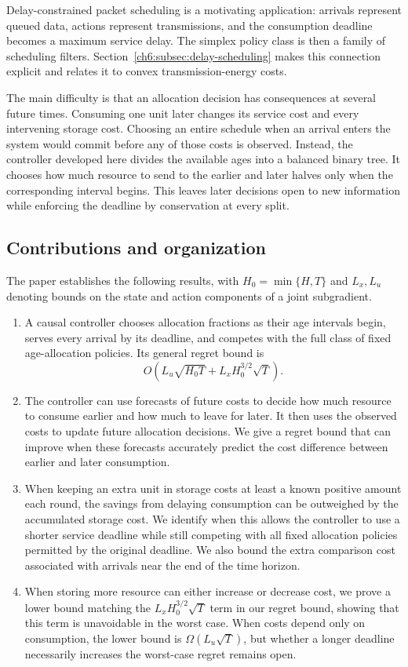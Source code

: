 \documentclass[11pt]{article}
\theoremstyle{plain}
\theoremstyle{remark}
\numberwithin{equation}{section}
\begin{document}
Delay-constrained packet scheduling is a motivating application:
arrivals represent queued data, actions represent transmissions, and the
consumption deadline becomes a maximum service delay. The simplex policy
class is then a family of scheduling filters. Section~\ref{ch6:subsec:delay-scheduling}
makes this connection explicit and relates it to convex transmission-energy
costs.

The main difficulty is that an allocation decision has consequences at
several future times. Consuming one unit later changes its service cost
and every intervening storage cost. Choosing an entire schedule when an
arrival enters the system would commit before any of those costs is
observed. Instead, the controller developed here divides the available ages
into a balanced binary tree. It chooses how much resource to send to the
earlier and later halves only when the corresponding interval begins.
This leaves later decisions open to new
information while enforcing the deadline by conservation at every split.

\subsection{Contributions and organization}

The paper establishes the following results, with
$H_0=\min\{H,T\}$ and $L_x,L_u$ denoting bounds on the state and action
components of a joint subgradient.
\begin{enumerate}[leftmargin=*]
\item A causal controller chooses allocation fractions as their age intervals
begin, serves every arrival by its deadline, and competes with the full class
of fixed age-allocation policies. Its general regret
bound is
\[
 O\!\left(L_u\sqrt{H_0T}+L_xH_0^{3/2}\sqrt T\right).
\]
\item The controller can use forecasts of future costs to decide how much
resource to consume earlier and how much to leave for later. It then uses
the observed costs to update future allocation decisions. We give a regret
bound that can improve when these forecasts accurately predict the cost
difference between earlier and later consumption.
\item When keeping an extra unit in storage costs at least a known positive
amount each round, the savings from delaying consumption can be outweighed
by the accumulated storage cost. We identify when this allows the controller
to use a shorter service deadline while still competing with all fixed
allocation policies permitted by the original deadline. We also bound the
extra comparison cost associated with arrivals near the end of the time
horizon.
\item When storing more resource can either increase or decrease cost, we
prove a lower bound matching the $L_xH_0^{3/2}\sqrt T$ term in our regret
bound, showing that this term is unavoidable in the worst case. When costs
depend only on consumption, the lower bound is $\Omega(L_u\sqrt T)$, but
whether a longer deadline necessarily increases the worst-case regret
remains open.
\end{enumerate}
\end{document}
